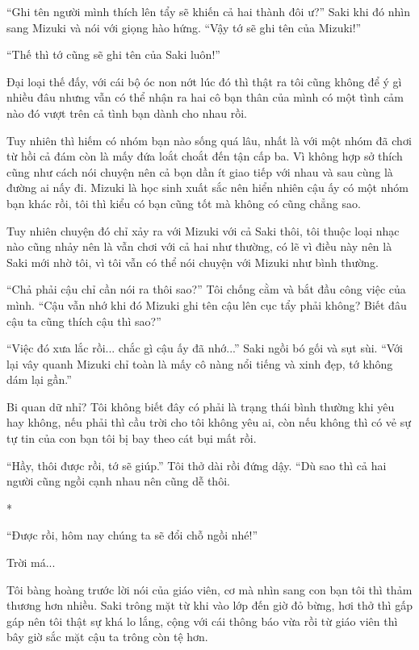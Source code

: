 {``Ghi tên người mình thích lên tẩy sẽ khiến cả hai thành đôi ư?'' Saki
khi đó nhìn sang Mizuki và nói với giọng hào hứng. ``Vậy tớ sẽ ghi tên
của Mizuki!''

``Thế thì tớ cũng sẽ ghi tên của Saki luôn!''

Đại loại thế đấy, với cái bộ óc non nớt lúc đó thì thật ra tôi cũng
không để ý gì nhiều đâu nhưng vẫn có thể nhận ra hai cô bạn thân của
mình có một tình cảm nào đó vượt trên cả tình bạn dành cho nhau rồi.

Tuy nhiên thì hiếm có nhóm bạn nào sống quá lâu, nhất là với một nhóm đã
chơi từ hồi cả đám còn là mấy đứa loắt choắt đến tận cấp ba. Vì không
hợp sở thích cũng như cách nói chuyện nên cả bọn dần ít giao tiếp với
nhau và sau cùng là đường ai nấy đi. Mizuki là học sinh xuất sắc nên
hiển nhiên cậu ấy có một nhóm bạn khác rồi, tôi thì kiểu có bạn cũng tốt
mà không có cũng chẳng sao.

Tuy nhiên chuyện đó chỉ xảy ra với Mizuki với cả Saki thôi, tôi thuộc
loại nhạc nào cũng nhảy nên là vẫn chơi với cả hai như thường, có lẽ vì
điều này nên là Saki mới nhờ tôi, vì tôi vẫn có thể nói chuyện với
Mizuki như bình thường.

``Chả phải cậu chỉ cần nói ra thôi sao?'' Tôi chống cằm và bắt đầu công
việc của mình. ``Cậu vẫn nhớ khi đó Mizuki ghi tên cậu lên cục tẩy phải
không? Biết đâu cậu ta cũng thích cậu thì sao?''

``Việc đó xưa lắc rồi... chắc gì cậu ấy đã nhớ...'' Saki ngồi bó gối và
sụt sùi. ``Với lại vây quanh Mizuki chỉ toàn là mấy cô nàng nổi tiếng và
xinh đẹp, tớ không dám lại gần.''

Bi quan dữ nhỉ? Tôi không biết đây có phải là trạng thái bình thường khi
yêu hay không, nếu phải thì cầu trời cho tôi không yêu ai, còn nếu không
thì có vẻ sự tự tin của con bạn tôi bị bay theo cát bụi mất rồi.

``Hầy, thôi được rồi, tớ sẽ giúp.'' Tôi thở dài rồi đứng dậy. ``Dù sao
thì cả hai người cũng ngồi cạnh nhau nên cũng dễ thôi.

*

``Được rồi, hôm nay chúng ta sẽ đổi chỗ ngồi nhé!''

Trời má...

Tôi bàng hoàng trước lời nói của giáo viên, cơ mà nhìn sang con bạn tôi
thì thảm thương hơn nhiều. Saki trông mặt từ khi vào lớp đến giờ đỏ
bừng, hơi thở thì gấp gáp nên tôi thật sự khá lo lắng, cộng với cái
thông báo vừa rồi từ giáo viên thì bây giờ sắc mặt cậu ta trông còn tệ
hơn.

}
